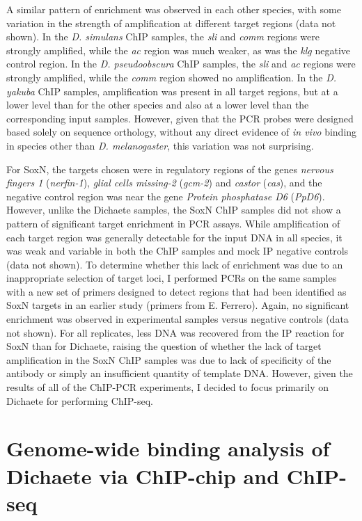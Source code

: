 A similar pattern of enrichment was observed in each other species, with some variation in the strength of amplification at different target regions (data not shown). In the \emph{D. simulans} ChIP samples, the \emph{sli} and \emph{comm} regions were strongly amplified, while the \emph{ac} region was much weaker, as was the \emph{klg} negative control region. In the \emph{D. pseudoobscura} ChIP samples, the \emph{sli} and \emph{ac} regions were strongly amplified, while the \emph{comm} region showed no amplification. In the \emph{D. yakuba} ChIP samples, amplification was present in all target regions, but at a lower level than for the other species and also at a lower level than the corresponding input samples. However, given that the PCR probes were designed based solely on sequence orthology, without any direct evidence of \emph{in vivo} binding in species other than \emph{D. melanogaster}, this variation was not surprising.

For SoxN, the targets chosen were in regulatory regions of the genes \emph{nervous fingers 1} (\emph{nerfin-1}), \emph{glial cells missing-2} (\emph{gcm-2}) and \emph{castor} (\emph{cas}), and the negative control region was near the gene \emph{Protein phosphatase D6} (\emph{PpD6}). However, unlike the Dichaete samples, the SoxN ChIP samples did not show a pattern of significant target enrichment in PCR assays. While amplification of each target region was generally detectable for the input DNA in all species, it was weak and variable in both the ChIP samples and mock IP negative controls (data not shown). To determine whether this lack of enrichment was due to an inappropriate selection of target loci, I performed PCRs on the same samples with a new set of primers designed to detect regions that had been identified as SoxN targets in an earlier study \citep{girard_chromatin_2006} (primers from E. Ferrero). Again, no significant enrichment was observed in experimental samples versus negative controls (data not shown). For all replicates, less DNA was recovered from the IP reaction for SoxN than for Dichaete, raising the question of whether the lack of target amplification in the SoxN ChIP samples was due to lack of specificity of the antibody or simply an insufficient quantity of template DNA. However, given the results of all of the ChIP-PCR experiments, I decided to focus primarily on Dichaete for performing ChIP-seq.

\section{Genome-wide binding analysis of Dichaete via ChIP-chip and ChIP-seq}
